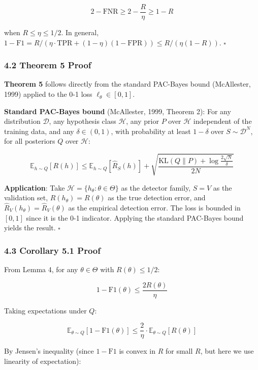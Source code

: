 \documentclass[
  12pt,
]{ctexart}
\begin{document}
\[2 - \text{FNR} \geq 2 - \frac{R}{\eta} \geq 1 - R\]

when \(R \leq \eta \leq 1/2\). In general,
\(1 - \text{F1} = R/(\eta \cdot \text{TPR} + (1-\eta)(1 - \text{FPR})) \leq R/(\eta(1 - R))\).
\(\square\)

\subsubsection{4.2 Theorem 5 Proof}\label{theorem-5-proof}

\textbf{Theorem 5} follows directly from the standard PAC-Bayes bound
(McAllester, 1999) applied to the 0-1 loss \(\ell_\theta \in [0,1]\).

\textbf{Standard PAC-Bayes bound} (McAllester, 1999, Theorem 2): For any
distribution \(\mathcal{D}\), any hypothesis class \(\mathcal{H}\), any
prior \(P\) over \(\mathcal{H}\) independent of the training data, and
any \(\delta \in (0,1)\), with probability at least \(1-\delta\) over
\(S \sim \mathcal{D}^N\), for all posteriors \(Q\) over \(\mathcal{H}\):

\[\mathbb{E}_{h \sim Q}[R(h)] \leq \mathbb{E}_{h \sim Q}[\hat{R}_S(h)] + \sqrt{\frac{\text{KL}(Q \parallel P) + \log\frac{2\sqrt{N}}{\delta}}{2N}}\]

\textbf{Application}: Take
\(\mathcal{H} = \{h_\theta : \theta \in \Theta\}\) as the detector
family, \(S = V\) as the validation set, \(R(h_\theta) = R(\theta)\) as
the true detection error, and
\(\hat{R}_V(h_\theta) = \hat{R}_V(\theta)\) as the empirical detection
error. The loss is bounded in \([0,1]\) since it is the 0-1 indicator.
Applying the standard PAC-Bayes bound yields the result. \(\square\)

\subsubsection{4.3 Corollary 5.1 Proof}\label{corollary-5.1-proof}

From Lemma 4, for any \(\theta \in \Theta\) with \(R(\theta) \leq 1/2\):

\[1 - \text{F1}(\theta) \leq \frac{2R(\theta)}{\eta}\]

Taking expectations under \(Q\):

\[\mathbb{E}_{\theta \sim Q}[1 - \text{F1}(\theta)] \leq \frac{2}{\eta} \cdot \mathbb{E}_{\theta \sim Q}[R(\theta)]\]

By Jensen's inequality (since \(1 - \text{F1}\) is convex in \(R\) for
small \(R\), but here we use linearity of expectation):
\end{document}
